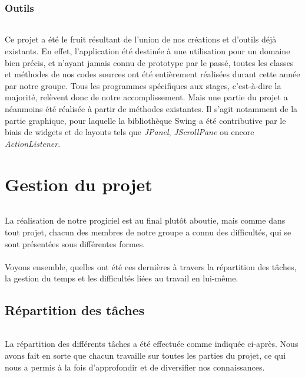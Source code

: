 \documentclass[a4paper,10pt]{report}
\begin{document}
	
	
    \section{Outils}
      \paragraph{}
	Ce projet a été le fruit résultant de l'union de nos créations et d'outils déjà existants. 
	En effet, l'application été destinée à une utilisation pour un domaine bien précis, et n'ayant jamais connu de prototype par le passé, toutes les classes et méthodes de nos codes sources ont été entièrement réalisées durant cette année par notre groupe.
	Tous les programmes spécifiques aux stages, c'est-à-dire la majorité, relèvent donc de notre accomplissement.
	Mais une partie du projet a néanmoins été réalisée à partir de méthodes existantes. 
	Il s'agit notamment de la partie graphique, pour laquelle la bibliothèque Swing a été contributive par le biais de widgets et de layouts tels que \textit{JPanel}, \textit{JScrollPane} ou encore \textit{ActionListener}.
	
	
		
\part{Gestion du projet}
\setcounter{chapter}{0}
      \paragraph{}
	  La réalisation de notre progiciel est au final plutôt aboutie, mais comme dans tout projet, chacun des membres de notre groupe a connu des difficultés, qui se sont présentées sous différentes formes.
	  ~\\~\\
	  Voyons ensemble, quelles ont été ces dernières à travers la répartition des tâches, la gestion du temps et les difficultés liées au travail en lui-même.
	
  \chapter{Répartition des tâches}
    \paragraph{}
      La répartition des différents tâches a été effectuée comme indiquée ci-après.
      Nous avons fait en sorte que chacun travaille sur toutes les parties du projet, ce qui nous a permis à la fois d'approfondir et de diversifier nos connaissances.
\end{document}
